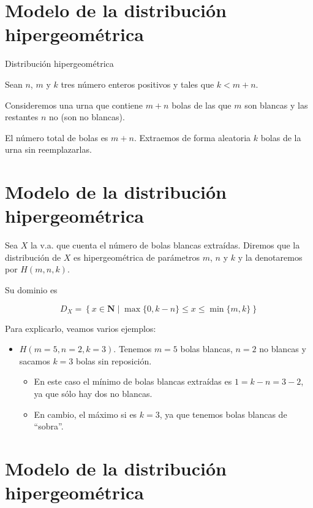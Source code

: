 \documentclass[
  letterpaper,
  DIV=11,
  numbers=noendperiod]{scrreprt}
\providecommand{\tightlist}{%
  \setlength{\itemsep}{0pt}\setlength{\parskip}{0pt}}\usepackage{longtable,booktabs,array}
\begin{document}
\section{Modelo de la distribución
hipergeométrica}\label{modelo-de-la-distribuciuxf3n-hipergeomuxe9trica-2}

Distribución hipergeométrica

Sean \(n\), \(m\) y \(k\) tres número enteros positivos y tales que
\(k<m+n\).

Consideremos una urna que contiene \(m+n\) bolas de las que \(m\) son
blancas y las restantes \(n\) no (son no blancas).

El número total de bolas es \(m+n\). Extraemos de forma aleatoria \(k\)
bolas de la urna sin reemplazarlas.

\section{Modelo de la distribución
hipergeométrica}\label{modelo-de-la-distribuciuxf3n-hipergeomuxe9trica-3}

Sea \(X\) la v.a. que cuenta el número de bolas blancas extraídas.
Diremos que la distribución de \(X\) es hipergeométrica de parámetros
\(m\), \(n\) y \(k\) y la denotaremos por \(H(m,n,k)\).

Su dominio es

\[D_X=\left\{x\in\mathbf{N}\mid \max\{0,k-n\}\leq  x \leq \min\{m,k\}\right\}\]

Para explicarlo, veamos varios ejemplos:

\begin{itemize}
\tightlist
\item
  \(H(m=5,n=2,k=3)\). Tenemos \(m=5\) bolas blancas, \(n=2\) no blancas
  y sacamos \(k=3\) bolas sin reposición.

  \begin{itemize}
  \tightlist
  \item
    En este caso el mínimo de bolas blancas extraídas es \(1=k-n=3-2\),
    ya que sólo hay dos no blancas.
  \item
    En cambio, el máximo si es \(k=3\), ya que tenemos bolas blancas de
    ``sobra''.
  \end{itemize}
\end{itemize}

\section{Modelo de la distribución
hipergeométrica}\label{modelo-de-la-distribuciuxf3n-hipergeomuxe9trica-4}
\end{document}
